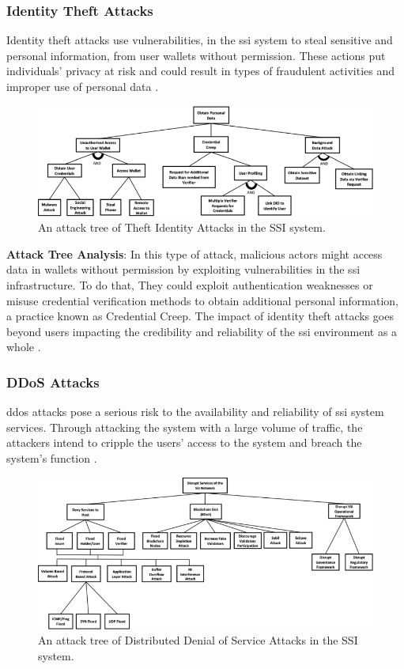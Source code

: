 \subsubsection{Identity Theft Attacks}

Identity theft attacks use vulnerabilities, in the \gls{ssi} system to steal sensitive and personal information, from user wallets without permission. These actions put 
individuals’ privacy at risk and could result in types of fraudulent activities and improper use of personal data \cite{CyberSecurity}. 

\begin{figure}[h]  
  \centering
  \includegraphics[width=1\textwidth]{Images/c5_5.png} 
  \caption{An attack tree of Theft Identity Attacks in the SSI system.}
\end{figure}

\textbf{Attack Tree Analysis}: In this type of attack, malicious actors might access data in wallets without permission by exploiting vulnerabilities in the \gls{ssi} 
infrastructure. To do that, They could exploit authentication weaknesses or misuse credential verification methods to obtain additional personal information, a practice 
known as Credential Creep. The impact of identity theft attacks goes beyond users impacting the credibility and reliability of the \gls{ssi} environment as a whole \cite{9659929}. 

\subsubsection{DDoS Attacks}

\gls{ddos} attacks pose a serious risk to the availability and reliability of \gls{ssi} system services. Through attacking the system with a large 
volume of traffic, the attackers intend to cripple the users’ access to the system and breach the system’s function \cite{CyberSecurity}.

\begin{figure}[h]  
  \centering
  \includegraphics[width=1\textwidth]{Images/c5_6.png} 
  \caption{An attack tree of Distributed Denial of Service Attacks in the SSI system.}
\end{figure}

